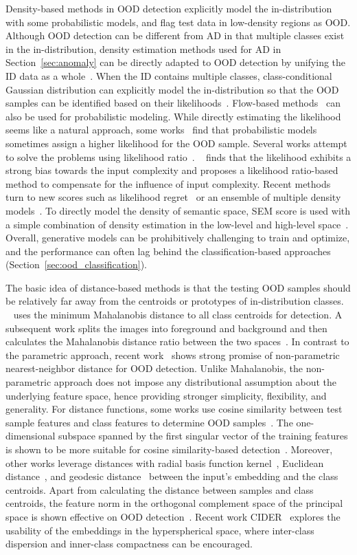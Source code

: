 \label{sec:ood_density}
Density-based methods in OOD detection explicitly model the in-distribution with some probabilistic models, and flag test data in low-density regions as OOD.
Although OOD detection can be different from AD in that multiple classes exist in the in-distribution, density estimation methods used for AD in Section~\ref{sec:anomaly} can be directly adapted to OOD detection by unifying the ID data as a whole~.
When the ID contains multiple classes, class-conditional Gaussian distribution can explicitly model the in-distribution so that the OOD samples can be identified based on their likelihoods~.
Flow-based methods~ can also be used for probabilistic modeling.
While directly estimating the likelihood seems like a natural approach, some  works~ find that probabilistic models sometimes assign a higher likelihood for the OOD sample.
Several works attempt to solve the problems using likelihood ratio~.
~ finds that the likelihood exhibits a strong bias towards the input complexity and proposes a likelihood ratio-based method to compensate for the influence of input complexity.
Recent methods turn to new scores such as likelihood regret~ or an ensemble of multiple density models~. 
To directly model the density of semantic space, SEM score is used with a simple combination of density estimation in the low-level and high-level space~.
Overall, generative models can be prohibitively challenging to train and optimize, and the performance can often lag behind the classification-based approaches (Section~\ref{sec:ood_classification}).

\label{sec:ood_distance}
The basic idea of distance-based methods is that the testing OOD samples should be relatively far away from the centroids or prototypes of in-distribution classes. 
~ uses the minimum Mahalanobis distance to all class centroids for detection. A subsequent work splits the images into foreground and background and then calculates the Mahalanobis distance ratio between the two spaces~. In contrast to the parametric approach, recent work~ shows strong promise of non-parametric nearest-neighbor distance for OOD detection. Unlike Mahalanobis, the non-parametric approach does not impose any distributional assumption about the underlying
feature space, hence providing stronger simplicity, flexibility, and generality.
For distance functions, some works use cosine similarity between test sample features and class features to determine OOD samples~.
The one-dimensional subspace spanned by the first singular vector of the training features is shown to be more suitable for cosine similarity-based detection~. 
Moreover, other works leverage distances with radial basis function kernel~, Euclidean distance~, and geodesic distance~ between the input’s embedding and the class centroids.
Apart from calculating the distance between samples and class centroids, the feature norm in the orthogonal complement space of the principal space is shown effective on OOD detection~. Recent work CIDER~ explores the usability of the embeddings in the hyperspherical space, where inter-class dispersion and inner-class compactness can be encouraged.

